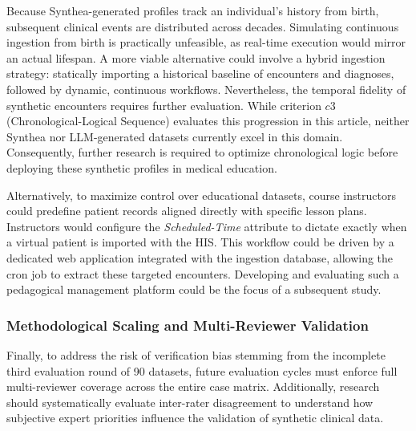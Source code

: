 Because Synthea-generated profiles track an individual’s history from birth, subsequent clinical events are distributed across decades. Simulating continuous ingestion from birth is practically unfeasible, as real-time execution would mirror an actual lifespan. A more viable alternative could involve a hybrid ingestion strategy: statically importing a historical baseline of encounters and diagnoses, followed by dynamic, continuous workflows. Nevertheless, the temporal fidelity of synthetic encounters requires further evaluation. While criterion $c3$ (Chronological-Logical Sequence) evaluates this progression in this article, neither Synthea nor LLM-generated datasets currently excel in this domain. Consequently, further research is required to optimize chronological logic before deploying these synthetic profiles in medical education.

Alternatively, to maximize control over educational datasets, course instructors could predefine patient records aligned directly with specific lesson plans. Instructors would configure the \textit{Scheduled-Time} attribute to dictate exactly when a virtual patient is imported with the HIS. This workflow could be driven by a dedicated web application integrated with the ingestion database, allowing the cron job to extract these targeted encounters. Developing and evaluating such a pedagogical management platform could be the focus of a subsequent study.

\subsubsection{Methodological Scaling and Multi-Reviewer Validation}
Finally, to address the risk of verification bias stemming from the incomplete third evaluation round of 90 datasets, future evaluation cycles must enforce full multi-reviewer coverage across the entire case matrix. Additionally, research should systematically evaluate inter-rater disagreement to understand how subjective expert priorities influence the validation of synthetic clinical data.